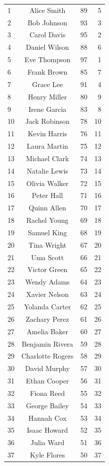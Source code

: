 \begin{longtable}{@{\extracolsep{\fill}} l c r r}
1 & Alice Smith & 89 & 5 \\
2 & Bob Johnson & 93 & 3 \\
3 & Carol Davis & 95 & 2 \\
4 & Daniel Wilson & 88 & 6 \\
5 & Eve Thompson & 97 & 1 \\
6 & Frank Brown & 85 & 7 \\
7 & Grace Lee & 91 & 4 \\
8 & Henry Miller & 80 & 9 \\
9 & Irene Garcia & 83 & 8 \\
10 & Jack Robinson & 78 & 10 \\
11 & Kevin Harris & 76 & 11 \\
12 & Laura Martin & 75 & 12 \\
13 & Michael Clark & 74 & 13 \\
14 & Natalie Lewis & 73 & 14 \\
15 & Olivia Walker & 72 & 15 \\
16 & Peter Hall & 71 & 16 \\
17 & Quinn Allen & 70 & 17 \\
18 & Rachel Young & 69 & 18 \\
19 & Samuel King & 68 & 19 \\
20 & Tina Wright & 67 & 20 \\
21 & Uma Scott & 66 & 21 \\
22 & Victor Green & 65 & 22 \\
23 & Wendy Adams & 64 & 23 \\
24 & Xavier Nelson & 63 & 24 \\
25 & Yolanda Carter & 62 & 25 \\
26 & Zachary Perez & 61 & 26 \\
27 & Amelia Baker & 60 & 27 \\
28 & Benjamin Rivera & 59 & 28 \\
29 & Charlotte Rogers & 58 & 29 \\
30 & David Murphy & 57 & 30 \\
31 & Ethan Cooper & 56 & 31 \\
32 & Fiona Reed & 55 & 32 \\
33 & George Bailey & 54 & 33 \\
34 & Hannah Cox & 53 & 34 \\
35 & Isaac Howard & 52 & 35 \\
36 & Julia Ward & 51 & 36 \\
37 & Kyle Flores & 50 & 37 \\

\end{longtable}
